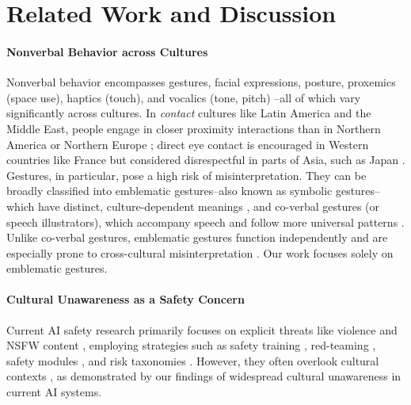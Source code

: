 \section{Related Work and Discussion}

\paragraph{Nonverbal Behavior across Cultures}
Nonverbal behavior encompasses gestures, facial expressions, posture, proxemics (space use), haptics (touch), and vocalics (tone, pitch) \cite{Knapp1972NonverbalCI, Matsumoto2013NonverbalCS}--all of which vary significantly across cultures. In \textit{contact} cultures like  Latin America and the Middle East, people engage in closer proximity interactions than in Northern America or Northern Europe \cite{hall1963system, sorokowska2017preferred}; direct eye contact is encouraged in Western countries like France but considered disrespectful in parts of Asia, such as Japan \cite{argyle1994gaze}.  Gestures, in particular, pose a high risk of misinterpretation. 
They can be broadly classified into emblematic gestures--also known as symbolic gestures--which have distinct, culture-dependent meanings \cite{Matsumoto2012CulturalSA}, and co-verbal gestures (or speech illustrators), which accompany speech and follow more universal patterns \cite{mcneill1992hand}. Unlike co-verbal gestures, emblematic gestures function independently and are especially prone to cross-cultural misinterpretation \cite{matsumoto2013cultural, kendon2004gesture}. Our work focuses solely on emblematic gestures. 




\paragraph{Cultural Unawareness as a Safety Concern}
Current AI safety research primarily focuses on explicit threats like violence and NSFW content \cite{Rando2022RedTeamingTS, Schramowski2022SafeLD, Yang2023SneakyPromptJT, Liu2023MMSafetyBenchAB}, employing strategies such as safety training \cite{Huang2023ASO, Shen2023DoAN}, red-teaming \cite{Ganguli2022RedTL, Liu2024ArondightRT, Ge2023MARTIL}, safety modules \cite{touvron2023llama, liu2024safety}, and risk taxonomies \cite{wang2023not, Brahman2024TheAO, vidgen2024introducing}. However, they often overlook cultural contexts \cite{sambasivan2021re}, as demonstrated by our findings of widespread cultural unawareness in current AI systems.



